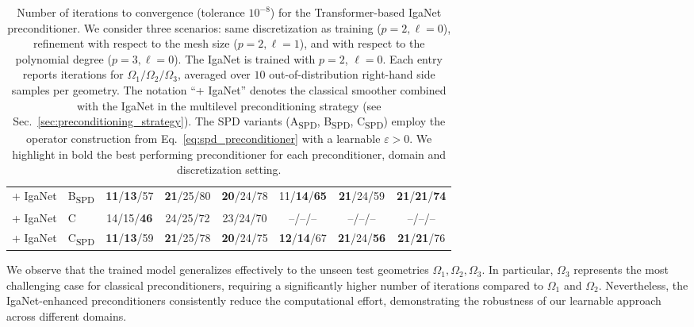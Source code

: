 \documentclass{article}
\newcommand{\reflevel}{\ell} %
\theoremstyle{plain}
\numberwithin{equation}{section}
\begin{document}
\begin{table}[!ht]
\begin{tabular}{llcccccc}
        + IgaNet       & B\textsubscript{SPD}& \textbf{11}/\textbf{13}/57          & \textbf{21}/25/80           & \textbf{20}/24/78                    
                                             & 11/\textbf{14}/\textbf{65}          & \textbf{21}/24/59           & \textbf{21}/\textbf{21}/\textbf{74}                             \\
        + IgaNet       & C                   & 14/15/\textbf{46}                   & 24/25/72                    & 23/24/70                    
                                             & --/--/--                            & --/--/--                    & --/--/--                             \\
        + IgaNet       & C\textsubscript{SPD}& \textbf{11}/\textbf{13}/59          & \textbf{21}/25/78           & \textbf{20}/24/75           
                                             & \textbf{12}/\textbf{14}/67          & \textbf{21}/24/\textbf{56}  & \textbf{21}/\textbf{21}/76                             \\
        \bottomrule
    \end{tabular}
    \caption{Number of iterations to convergence (tolerance $10^{-8}$) for the Transformer-based IgaNet preconditioner. We consider three scenarios: same discretization as training ($p=2, \reflevel=0$), refinement with respect to the mesh size ($p=2, \reflevel=1$), and with respect to the polynomial degree ($p=3, \reflevel=0$). The IgaNet is trained with $p=2$, $\reflevel=0$. Each entry reports iterations for $\Omega_1/\Omega_2/\Omega_3$, averaged over $10$ out-of-distribution right-hand side samples per geometry. The notation ``+ IgaNet'' denotes the classical smoother combined with the IgaNet in the multilevel preconditioning strategy (see Sec.~\ref{sec:preconditioning_strategy}). The SPD variants (A\textsubscript{SPD}, B\textsubscript{SPD}, C\textsubscript{SPD}) employ the operator construction from Eq.~\eqref{eq:spd_preconditioner} with a learnable $\varepsilon > 0$. We highlight in bold the best performing preconditioner for each preconditioner, domain and discretization setting.}
    \label{table:transformer_precond}
\end{table}
We observe that the trained model generalizes effectively to the unseen test geometries $\Omega_1, \Omega_2, \Omega_3$. In particular, $\Omega_3$ represents the most challenging case for classical preconditioners, requiring a significantly higher number of iterations compared to $\Omega_1$ and $\Omega_2$. Nevertheless, the IgaNet-enhanced preconditioners consistently reduce the computational effort, demonstrating the robustness of our learnable approach across different domains.
\end{document}
